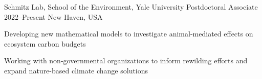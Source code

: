 

\begin{cventries}
  \cventry
    {\normalsize Schmitz Lab, School of the Environment, Yale University} %
    {\normalsize Postdoctoral Associate} %
    {\normalsize 2022--Present} %
    {\normalsize New Haven, USA} %
    {\normalsize
      \begin{cvitems} %
        \item {Developing new mathematical models to investigate animal-mediated effects on ecosystem carbon budgets}
        \item {Working with non-governmental organizations to inform rewilding efforts and expand nature-based climate change solutions}
      \end{cvitems} 
    }
\end{cventries}
